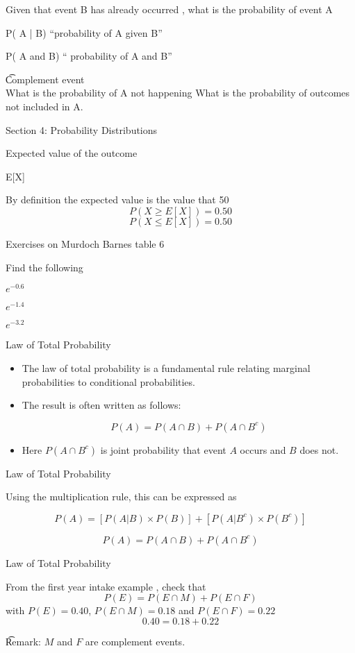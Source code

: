 

Given that event B has already occurred ,   what is the probability of event A

P( A | B)  “probability of A given B”

P( A and B) “ probability of A and B”

\t{Complement event}\\

What is the probability of A not happening
What is the probability of outcomes not included in A.




Section 4: Probability Distributions

Expected value of the outcome

E[X]

By definition the expected value is the value that 50%
\[
P( X \geq E[X])  = 0.50 \]
\[ P(X \leq E[X]) = 0.50\]



Exercises on Murdoch Barnes table 6

Find the following

$e^{-0.6}$

$e^{-1.4}$

$e^{-3.2}$


{
{Law of Total Probability}

\vspace{-1cm}
\begin{itemize}
\item The law of total probability is a fundamental rule relating marginal probabilities to conditional probabilities.\item  The result is often written as follows:

\[ P(A)  = P(A \cap B) + P(A \cap B^c) \]


\item Here $P(A \cap B^c)$ is joint probability that event $A$ occurs and $B$ does not.
\end{itemize}
}
{
{Law of Total Probability}




Using the multiplication rule, this can be expressed as

\[ P(A) = \left[ P(A | B)\times P(B) \right] + \left[ P(A | B^{c})\times P(B^{c}) \right] \]

\[ P(A)  = P(A \cap B) + P(A \cap B^c) \]
}
{
{Law of Total Probability}

From the first year intake example , check that
\[ P(E)  = P(E \cap M) + P(E \cap F) \]
with $ P(E) = 0.40$, $ P(E \cap M) = 0.18$ and  $ P(E \cap F) = 0.22$
\[ 0.40  = 0.18 + 0.22 \]

\normalsize
\t{Remark:}  $M$ and $F$ are complement events.

}



